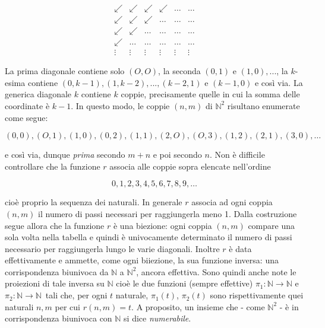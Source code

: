$$
    \begin{array}{cccccc}
        \swarrow & \swarrow & \swarrow & \swarrow & \ldots & \ldots \\
        \swarrow & \swarrow & \swarrow & \ldots   & \ldots & \ldots \\
        \swarrow & \swarrow & \ldots   & \ldots   & \ldots & \ldots \\
        \swarrow & \ldots   & \ldots   & \ldots   & \ldots & \ldots \\
        \vdots   & \vdots   & \vdots   & \vdots   & \vdots & \vdots
    \end{array}
$$

La prima diagonale contiene solo $(O, O)$, la seconda $(0, 1)$ e $(1, 0), ...$,
la $k$-esima contiene $(0, k - 1), (1, k - 2), ..., (k - 2, 1)$ e $(k - 1, 0)$ e
così via. La generica diagonale $k$ contiene $k$ coppie, precisamente quelle in
cui la somma delle coordinate è $k - 1$. In questo modo, le coppie $(n, m)$ di
$\mathbb{N}^2$ risultano enumerate come segue:

$$
    (0, 0), (O, 1), (1, 0), (0, 2), (1, 1), (2, O), (O, 3), (1, 2), (2, 1), (3, 0), \ldots
$$

e così via, dunque \textit{prima} secondo $m + n$ e poi secondo $n$.
Non è difficile controllare che la funzione $r$ associa alle coppie sopra elencate
nell'ordine

$$
    0, 1, 2, 3, 4, 5, 6, 7, 8, 9, \ldots
$$

cioè proprio la sequenza dei naturali. In generale $r$ associa ad ogni coppia $(n, m)$
il numero di passi necessari per raggiungerla meno 1. Dalla costruzione segue allora
che la funzione $r$ è una biezione: ogni coppia $(n, m)$ compare una sola volta
nella tabella e quindi è univocamente determinato il numero di passi necessario
per raggiungerla lungo le varie diagonali. Inoltre $r$ è data effettivamente e
ammette, come ogni biiezione, la sua funzione inversa: una corrispondenza biunivoca
da $\mathbb{N}$ a $\mathbb{N}^2$, ancora effettiva. Sono quindi anche note le
proiezioni di tale inversa su $\mathbb{N}$ cioè le due funzioni (sempre effettive)
$\pi_1 : \mathbb{N} \rightarrow \mathbb{N}$ e $\pi_2 : \mathbb{N} \rightarrow \mathbb{N}$\
tali che, per ogni $t$ naturale, $\pi_1(t)$, $\pi_2(t)$ sono rispettivamente quei
naturali $n, m$ per cui $r(n, m) = t$. A proposito, un insieme che - come $\mathbb{N}^2$ -
è in corrispondenza biunivoca con $\mathbb{N}$ si dice \textit{numerabile}.